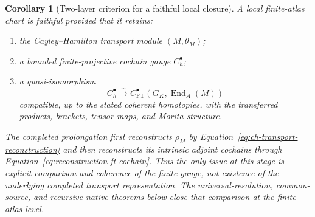 \documentclass[11pt]{article}
\newtheorem{corollary}[theorem]{Corollary}
\theoremstyle{definition}
\begin{document}
\begin{corollary}[Two-layer criterion for a faithful local closure]\label{cor:two-layer-faithful-closure}
A local finite-atlas chart is faithful provided that it retains:
\begin{enumerate}[label=\textnormal{(\alph*)}]
\item the Cayley--Hamilton transport module $(M,\theta_M)$;
\item a bounded finite-projective cochain gauge $C_h^\bullet$;
\item a quasi-isomorphism
\[
 C_h^\bullet\xrightarrow{\sim}
 C_{\mathrm{FT}}^\bullet(G_K,\operatorname{End}_A(M))
\]
compatible, up to the stated coherent homotopies, with the transferred
products, brackets, tensor maps, and Morita structure.
\end{enumerate}
The completed prolongation first reconstructs $\rho_M$ by
Equation~\eqref{eq:ch-transport-reconstruction} and then reconstructs its
intrinsic adjoint cochains through Equation~\eqref{eq:reconstruction-ft-cochain}.
Thus the only issue at this stage is explicit comparison and coherence of the
finite gauge, not existence of the underlying completed transport
representation.  The universal-resolution, common-source, and recursive-native
theorems below close that comparison at the finite-atlas level.
\end{corollary}
\end{document}

